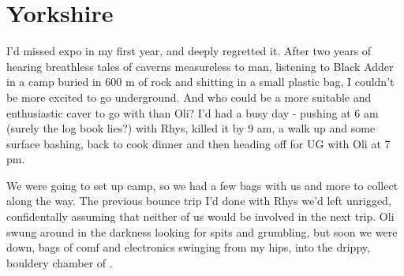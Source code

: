 \section{Yorkshire}
\begin{marginfigure}
\end{marginfigure}

I’d missed expo in my first year, and deeply regretted it. After two years of hearing breathless tales of caverns measureless to man, listening to Black Adder in a camp buried in 600 m of rock and shitting in a small plastic bag, I couldn’t be more excited to go underground. And who could be a more suitable and enthusiastic caver to go with than Oli? I’d had a busy day - pushing  at 6 am (surely the log book lies?) with Rhys, killed it by 9 am, a walk up  and some surface bashing, back to cook dinner and then heading off for UG with Oli at 7 pm.

We were going to set up camp, so we had a few bags with us and more to collect along the way. The previous bounce trip I’d done with Rhys we’d left  unrigged, confidentally assuming that neither of us would be involved in the next trip. Oli swung around in the darkness looking for spits and grumbling, but soon we were down, bags of comf and electronics swinging from my hips, into the drippy, bouldery chamber of .

